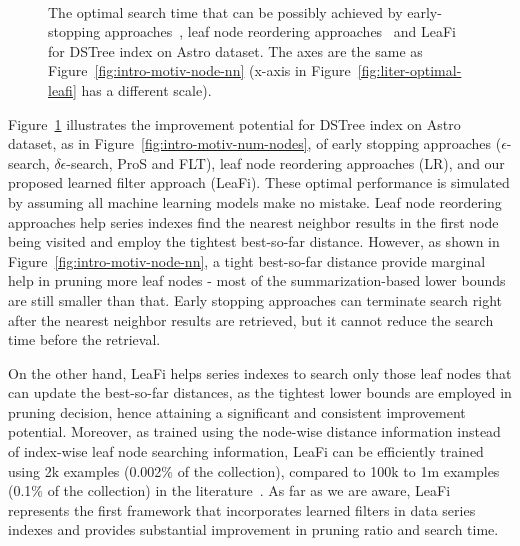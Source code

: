 \begin{figure}[tb]
  \centering
  
  \\[-2ex]
  
  \setcounter{subfigure}{0}
    
  \vspace*{-0.2cm}
  \caption{The optimal search time that can be possibly achieved by early-stopping approaches~\cite{DBLP:journals/pvldb/EchihabiZPB19, DBLP:conf/sigmod/GogolouTEBP20, DBLP:journals/vldb/EchihabiTGBP23}, leaf node reordering approaches~\cite{SC:kang2021case} and LeaFi for DSTree index on Astro dataset.
  The axes are the same as Figure~\ref{fig:intro-motiv-node-nn} (x-axis in Figure~\ref{fig:liter-optimal-leafi} has a different scale).
  }
  \label{fig:liter-comparison}
\end{figure}

Figure~\ref{fig:liter-comparison} illustrates the improvement potential for DSTree index on Astro dataset, as in Figure~\ref{fig:intro-motiv-num-nodes}, of early stopping approaches ($\epsilon$-search, $\delta\epsilon$-search, ProS and FLT), leaf node reordering approaches (LR), and our proposed learned filter approach (LeaFi).
These optimal performance is simulated by assuming all machine learning models make no mistake.
Leaf node reordering approaches help series indexes find the nearest neighbor results in the first node being visited and employ the tightest best-so-far distance.
However, as shown in Figure~\ref{fig:intro-motiv-node-nn}, a tight best-so-far distance provide marginal help in pruning more leaf nodes - most of the summarization-based lower bounds are still smaller than that. 
Early stopping approaches can terminate search right after the nearest neighbor results are retrieved, but it cannot reduce the search time before the retrieval. 

On the other hand, LeaFi helps series indexes to search only those leaf nodes that can update the best-so-far distances, as the tightest lower bounds are employed in pruning decision, hence attaining a significant and consistent improvement potential.
Moreover, as trained using the node-wise distance information instead of index-wise leaf node searching information, LeaFi can be efficiently trained using 2k examples (0.002\% of the collection), compared to 100k to 1m examples (0.1\% of the collection) in the literature~\cite{DBLP:conf/sigmod/LiZAH20, SC:kang2021case}.
As far as we are aware, LeaFi represents the first framework that incorporates learned filters in data series indexes and provides substantial improvement in pruning ratio and search time.

